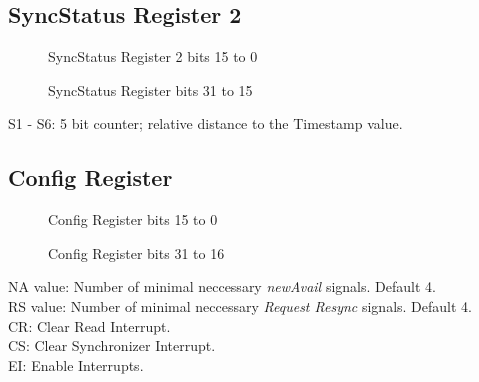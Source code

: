 \subsection{SyncStatus Register 2} 
\label{sec:SyncStatusReg2}
\begin{figure}[htb]
	\begin{center}
	\end{center}
	\caption[SyncStatus Register 2 bits 15 to 0]{SyncStatus Register 2 bits 15 to 0}
	\label{fig:SSR21}
\end{figure}
\begin{figure}[htb]
	\begin{center}
	\end{center}
	\caption[SyncStatus Register bits 31 to 16]{SyncStatus Register bits 31 to 15}
	\label{fig:SSR22}
\end{figure}
S1 - S6: 5 bit counter; relative distance to the Timestamp value. \\
\subsection{Config  Register} 
\label{sec:configReg}
\begin{figure}[htb]
	\begin{center}
	\end{center}
	\caption[Config Register bits 15 to 0]{Config Register bits 15 to 0}
	\label{fig:CR1}
\end{figure}
\begin{figure}
	\begin{center}
	\end{center}
	\caption[Config Register bits 16 to 31]{Config Register bits 31 to 16}
	\label{fig:CR2}
\end{figure}
\noindent
NA value: Number of minimal neccessary \textit{newAvail} signals. Default 4. \\
RS value: Number of minimal neccessary \textit{Request Resync} signals. Default 4. \\ 
CR: Clear Read Interrupt. \\
CS: Clear Synchronizer Interrupt. \\ 
EI: Enable Interrupts. \\
